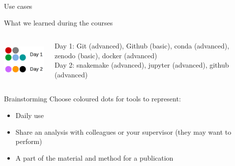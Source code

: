 \begin{frame}{Use cases}
\begin{block}{What we learned during the courses}
\begin{columns}
\begin{column}{0.3\textwidth}
\includegraphics[height=2cm]{10_usecases/images/FAIR_dots_formation.png}
\end{column}
\begin{column}{0.65\textwidth}
Day 1: Git (advanced), Github (basic), conda (advanced), zenodo (basic), docker (advanced)\\
Day 2: snakemake (advanced), jupyter (advanced), github (advanced)
\end{column}
\end{columns}
\end{block}
\begin{exampleblock}{Brainstorming}
Choose coloured dots for tools to represent:
\begin{itemize}
    \item Daily use
    \item Share an analysis with colleagues or your supervisor (they may want to perform)
    \item A part of the material and method for a publication 
\end{itemize}
\end{exampleblock}
\end{frame}